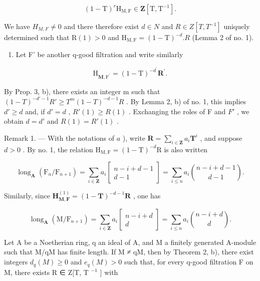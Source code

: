 \[
(1 - \mathrm{T}) ^ {r} \mathrm{H} _ {\mathrm{M}, \mathrm{F}} \in \mathbf {Z} [ \mathrm{T}, \mathrm{T} ^ {- 1} ].
\]

We have \(H_{M,F} \neq 0\) and there therefore exist \(d \in N\) and \(R \in Z[T, T^{-1}]\) uniquely determined such that \(\mathrm{R}(1) > 0\) and \(\mathrm{H}_{\mathrm{M},\mathrm{F}} = (1 - \mathrm{T})^{-d}. R\) (Lemma 2 of no. 1).

\begin{enumerate}
\def\labelenumi{\alph{enumi})}
\setcounter{enumi}{1}
\tightlist
\item
  Let F' be another q-good filtration and write similarly
\end{enumerate}

\[
\mathrm{H} _ {\mathbf {M}, \mathrm{F} ^ {\prime}} = (1 - \mathrm{T}) ^ {- d ^ {\prime}} \mathbf {R} ^ {\prime}.
\]

By Prop. 3, b), there exists an integer m such that \((1 - T)^{-d'-1}R' \geqslant T^{m}(1 - T)^{-d-1}R\) . By Lemma 2, b) of no. 1, this implies \(d' \geqslant d\) and, if \(d' = d\) , \(R'(1) \geqslant R(1)\) . Exchanging the roles of F and \(F'\) , we obtain \(d = d'\) and \(R(1) = R'(1)\) .

Remark 1. --- With the notations of \(a\) ), write \(\mathbf{R} = \sum_{i \in \mathbf{Z}} a_i \mathbf{T}^i\) , and suppose \(d > 0\) . By no. 1, the relation \(\mathrm{H}_{\mathrm{M},\mathrm{F}} = (1 - \mathrm{T})^{-d}\mathrm{R}\) is also written

\[
\operatorname{long} _ {\mathbf {A}} \left(\mathrm{F} _ {n} / \mathrm{F} _ {n + 1}\right) = \sum_ {i \in \mathbf {Z}} a _ {i} \left[ \begin{array}{c} n - i + d - 1 \\ d - 1 \end{array} \right] = \sum_ {i \leqslant n} a _ {i} \binom {n - i + d - 1} {d - 1}.\tag{11}
\]

Similarly, since \(\mathbf{H}_{\mathbf{M},\mathbf{F}}^{(1)} = (1 - \mathbf{T})^{-d - 1}\mathbf{R}\) , one has

\[
\operatorname{long} _ {\mathbf {A}} \left(\mathrm{M} / \mathrm{F} _ {n + 1}\right) = \sum_ {i \in \mathbf {Z}} a _ {i} \left[ \begin{array}{c} n - i + d \\ d \end{array} \right] = \sum_ {i \leqslant n} a _ {i} \binom {n - i + d} {d}.\tag{12}
\]

Let A be a Noetherian ring, q an ideal of A, and M a finitely generated A-module such that M/qM has finite length. If M ≠ qM, then by Theorem 2, b), there exist integers \(d_{q}(M) \geqslant 0\) and \(e_{q}(M) > 0\) such that, for every q-good filtration F on M, there exists R ∈ Z{[}T, T \(^{-1}\) {]} with

